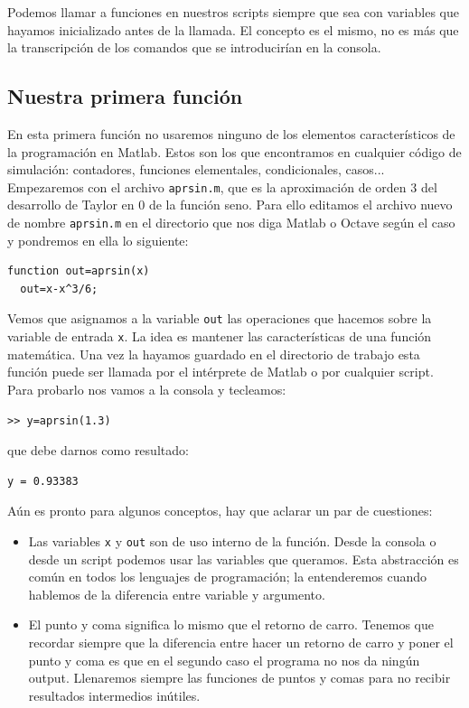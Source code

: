 Podemos llamar a funciones en nuestros scripts siempre que sea con
variables que hayamos inicializado antes de la llamada. El concepto es
el mismo, no es más que la transcripción de los comandos que se
introducirían en la consola.


\subsection{Nuestra primera función}

En esta primera función no usaremos ninguno de los elementos
característicos de la programación en Matlab. Estos son los que
encontramos en cualquier código de simulación: contadores, funciones
elementales, condicionales, casos... Empezaremos con el archivo
\texttt{aprsin.m}, que es la aproximación de orden 3 del desarrollo de
Taylor en 0 de la función seno. Para ello editamos el archivo nuevo de
nombre \texttt{aprsin.m} en el directorio que nos diga Matlab o Octave
según el caso y pondremos en ella lo siguiente:

\begin{lstlisting}
function out=aprsin(x)
  out=x-x^3/6;
\end{lstlisting}

Vemos que asignamos a la variable \texttt{out} las operaciones
que hacemos sobre la variable de entrada \texttt{x}. La idea es
mantener las características de una función matemática. Una vez la
hayamos guardado en el directorio de trabajo esta función puede ser llamada
por el intérprete de Matlab o por cualquier script.
Para probarlo nos vamos a la consola y tecleamos:

\begin{lstlisting}
>> y=aprsin(1.3)
\end{lstlisting}
que debe darnos como resultado:

\begin{lstlisting}
y = 0.93383
\end{lstlisting}
Aún es pronto para algunos conceptos, hay que aclarar un par de
cuestiones:

\begin{itemize}
\item Las variables \texttt{x} y \texttt{out} son de uso interno de la
  función.  Desde la consola o desde un script podemos usar las
  variables que queramos. Esta abstracción es común en todos los
  lenguajes de programación; la entenderemos cuando hablemos de la
  diferencia entre variable y argumento.
\item El punto y coma significa lo mismo que el retorno de carro.
  Tenemos que recordar siempre que la diferencia entre hacer un
  retorno de carro y poner el punto y coma es que en el segundo caso
  el programa no nos da ningún output. Llenaremos siempre las
  funciones de puntos y comas para no recibir resultados intermedios
  inútiles.
\end{itemize}

